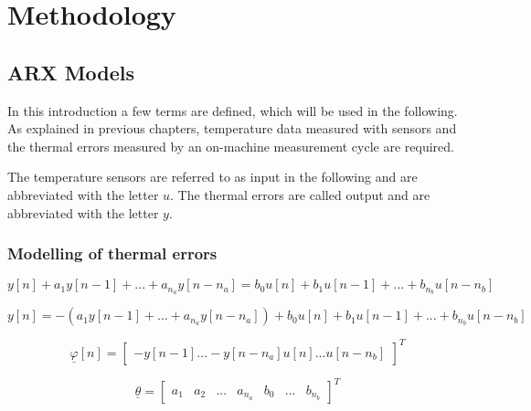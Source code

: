 \chapter{Methodology}
\label{chp:sample_chapter}



\section{ARX Models}
\label{sec:ARX_models}


In this introduction a few terms are defined, which will be used in the following. As explained in previous chapters, temperature data measured with sensors and the thermal errors measured by an on-machine measurement cycle are required.

The temperature sensors are referred to as input in the following and are abbreviated with the letter $u$. The thermal errors are called output and are abbreviated with the letter $y$. 

\subsection{Modelling of thermal errors}
\label{sec:modelling of errors}



 \begin{equation}
	y[n]+a_1y[n-1]+...+a_{n_a}y[n-n_a] = b_0 u[n]+b_1u[n-1]+...+b_{n_b} u[n-n_b]
	\label{eq:arx_eq}
\end{equation}



 \begin{equation}
	y[n] = -(a_1y[n-1]+...+a_{n_a}y[n-n_a]) + b_0 u[n]+b_1u[n-1]+...+b_{n_b} u[n-n_b]
	\label{eq:arx_eq_extendet}
\end{equation}


 \begin{equation}
 	\underline{\varphi}[n] = \begin{bmatrix}
		-y[n-1]...-y[n-n_a]  u[n]...u[n-n_b]
				\end{bmatrix}^T
	\label{eq:arx_eq_matix}
\end{equation}

 \begin{equation}
	\underline{\theta} =  \begin{bmatrix}
		a_1 & a_2 & ... & a_{n_a} & b_0 & ... & b_{n_b}
				\end{bmatrix}^T
	\label{eq:thetavec}
\end{equation}

